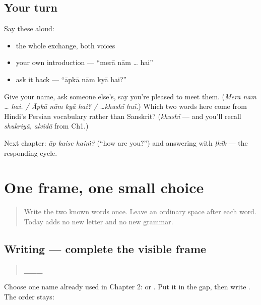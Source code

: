\subsection*{Your turn}
Say these aloud:

\begin{itemize}
\raggedright
  \item the whole exchange, both voices
  \item your own introduction — \textquotedblleft{}merā nām … hai\textquotedblright{}
  \item ask it back — \textquotedblleft{}āpkā nām kyā hai?\textquotedblright{}
\end{itemize}

\begin{tcolorbox}[breakable,colback=teal!4,colframe=teal!35!black,title={Before you move on}]
Give your name, ask someone else's, say you're pleased to meet them. (\emph{Merā nām … hai. / Āpkā nām kyā hai? / …khushī huī.}) Which two words here come from Hindi's Persian vocabulary rather than Sanskrit? (\emph{khushī} — and you'll recall \emph{shukriyā}, \emph{alvidā} from Ch1.)

Next chapter: \emph{āp kaise haiṁ?} (\textquotedblleft{}how are you?\textquotedblright{}) and answering with \emph{ṭhīk} — the responding cycle.
\end{tcolorbox}
\section[\texorpdfstring{\hi{मेरा} \hi{नाम} \hi{मीरा} \hi{है} (merā nām Mīrā hai)}{मेरा नाम मीरा है (merā nām Mīrā hai)}]{One frame, one small choice}

\label{lesson:HI-W06-name-sentence-frame}



\begin{quote}
Write the two known words \textbf{ } once. Leave an ordinary space after each word. Today adds no new letter and no new grammar.
\end{quote}

\subsection*{Writing — complete the visible frame}
\begin{quote}
\textbf{  \_\_\_ }
\end{quote}

Choose one name already used in Chapter 2: \textbf{} or \textbf{}. Put it in the gap, then write \textbf{}. The order stays:

